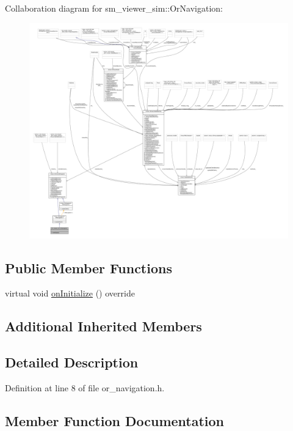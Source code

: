 Collaboration diagram for sm\+\_\+viewer\+\_\+sim\+:\+:Or\+Navigation\+:
\nopagebreak
\begin{figure}[H]
\begin{center}
\leavevmode
\includegraphics[width=350pt]{classsm__viewer__sim_1_1OrNavigation__coll__graph}
\end{center}
\end{figure}
\subsection*{Public Member Functions}
\begin{DoxyCompactItemize}
\item 
virtual void \hyperlink{classsm__viewer__sim_1_1OrNavigation_a6f39ecbb3c1ad253c283588df860a8c4}{on\+Initialize} () override
\end{DoxyCompactItemize}
\subsection*{Additional Inherited Members}


\subsection{Detailed Description}


Definition at line 8 of file or\+\_\+navigation.\+h.



\subsection{Member Function Documentation}
